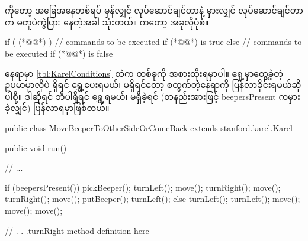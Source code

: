 \begin{sloppypar}
\section{  }
\enIfElseStatement ကိုတော့ အခြေအနေတစ်ရပ် မှန်လျှင် လုပ်ဆောင်ချင်တာနဲ့ မှားလျှင် လုပ်ဆောင်ချင်တာ က မတူပဲကွဲပြား နေတဲ့အခါ သုံးတယ်။ \mmsyntax ကတော့ အခုလိုပုံစံ။
\begin{lstcodeminimal}
if ( (*@@*) ) {
        // commands to be executed if (*@@*) is true
} else {
        // commands to be executed if (*@@*) is false
}
\end{lstcodeminimal}
\noindent {} နေရာမှာ \Tbl \vref*{tbl:KarelConditions} ထဲက \mmCondition တစ်ခုကို အစားထိုးရမှာပါ။ ရှေ့မှာတွေ့ခဲ့တဲ့ ဥပမာမှာလိုပဲ \mmbeeper ရှိရင် ရွှေ့ပေးရမယ်၊ မရှိရင်တော့ စထွက်တဲ့နေရာကို ပြန်လာခိုင်းရမယ်ဆိုပါစို့။ ဒါဆိုရင် ဘိပါရှိရင် ရွှေ့ရမယ်၊ မရှိခဲ့ရင် (တနည်းအားဖြင့် beepersPresent \mmCondition ကမှားခဲ့လျှင်) ပြန်လာရမှာဖြစ်တယ်။ 

\begin{lstcodesimple}[float, caption={\mycodelstcpt{MoveBeeperToOtherSideOrComeBack.java}}, label={lst:MoveBeeperToOtherSideOrComeBack}]
public class MoveBeeperToOtherSideOrComeBack extends stanford.karel.Karel {
        public void run() {
                
                // ... 

                if (beepersPresent()) {
                        pickBeeper();
                        turnLeft();
                        move();
                        turnRight();
                        move();
                        turnRight();
                        move();
                        putBeeper();
                        turnLeft();
                } else {
                        turnLeft();
                        turnLeft();
                        move();
                        move();
                        move();
                }
        }

        // . . .turnRight method definition here
        
}
\end{lstcodesimple}

\end{sloppypar}